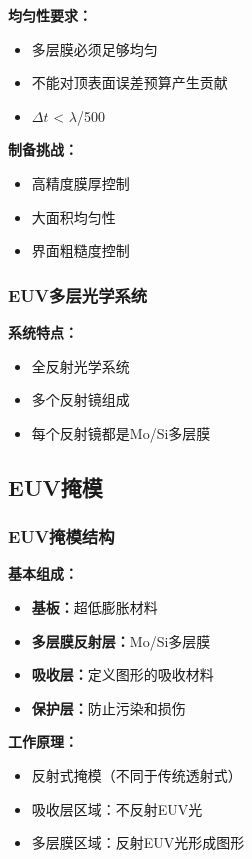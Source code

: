 \documentclass[UTF8,12pt,a4paper]{ctexart}
\begin{document}
\textbf{均匀性要求：}
\begin{itemize}
    \item 多层膜必须足够均匀
    \item 不能对顶表面误差预算产生贡献
    \item $\Delta t$ < $\lambda$/500
\end{itemize}

\textbf{制备挑战：}
\begin{itemize}
    \item 高精度膜厚控制
    \item 大面积均匀性
    \item 界面粗糙度控制
\end{itemize}

\subsubsection{EUV多层光学系统}

\textbf{系统特点：}
\begin{itemize}
    \item 全反射光学系统
    \item 多个反射镜组成
    \item 每个反射镜都是Mo/Si多层膜
\end{itemize}

\subsection{EUV掩模}

\subsubsection{EUV掩模结构}

\textbf{基本组成：}
\begin{itemize}
    \item \textbf{基板：}超低膨胀材料
    \item \textbf{多层膜反射层：}Mo/Si多层膜
    \item \textbf{吸收层：}定义图形的吸收材料
    \item \textbf{保护层：}防止污染和损伤
\end{itemize}

\textbf{工作原理：}
\begin{itemize}
    \item 反射式掩模（不同于传统透射式）
    \item 吸收层区域：不反射EUV光
    \item 多层膜区域：反射EUV光形成图形
\end{itemize}
\end{document}
